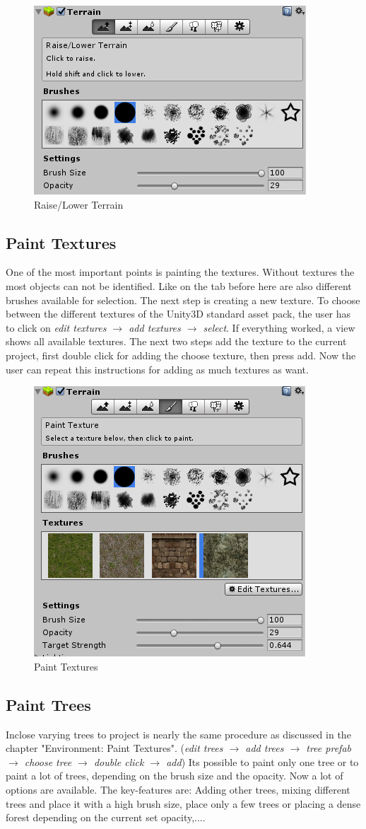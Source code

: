 \documentclass[12pt, a4paper, titlepage]{article}
\begin{document}
\begin{figure}[htbp]
  \centering
  \includegraphics[width=.4\textwidth]{pictures/raise_lower_terrain}
  \caption{Raise/Lower Terrain}
  \label{fig:raise_lower_terrain}
\end{figure}

\subsection{Paint Textures}
One of the most important points is painting the textures. Without textures the most objects can not be identified. 
Like on the tab before here are also different brushes available for selection. The next step is creating a new texture. 
To choose between the different textures of the Unity3D standard asset pack, the user has to click on \emph{edit textures $\rightarrow$ add textures $\rightarrow$ select}. If everything worked, a view shows all available textures. The next two steps add the texture to the current project, first double click for adding the choose texture, then press add. Now the user can repeat this instructions for adding as much textures as want.

\begin{figure}[htbp]
  \centering
  \includegraphics[width=.4\textwidth]{pictures/paint_textures}
  \caption{Paint Textures}
  \label{fig:paint_textures}
\end{figure}

\subsection{Paint Trees}
Inclose varying trees to project is nearly the same procedure as discussed in the chapter "Environment: Paint Textures". (\emph{edit trees $\rightarrow$ add trees $\rightarrow$ tree prefab $\rightarrow$ choose tree $\rightarrow$ double click $\rightarrow$ add})
Its possible to paint only one tree or to paint a lot of trees, depending on the brush size and the opacity. Now a lot of options are available. The key-features are: Adding other trees, mixing different trees and place it with a high brush size, place only a few trees or placing a dense forest depending on the current set opacity,....
\end{document}

